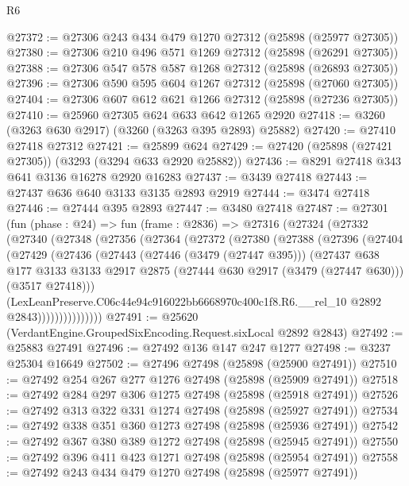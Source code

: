 \begin{lexlean}{R6}
\begin{coremodule}
@27372 := @27306 @243 @434 @479 @1270 @27312 (@25898 (@25977 @27305))
@27380 := @27306 @210 @496 @571 @1269 @27312 (@25898 (@26291 @27305))
@27388 := @27306 @547 @578 @587 @1268 @27312 (@25898 (@26893 @27305))
@27396 := @27306 @590 @595 @604 @1267 @27312 (@25898 (@27060 @27305))
@27404 := @27306 @607 @612 @621 @1266 @27312 (@25898 (@27236 @27305))
@27410 := @25960 @27305 @624 @633 @642 @1265 @2920
@27418 := @3260 (@3263 @630 @2917) (@3260 (@3263 @395 @2893) @25882)
@27420 := @27410 @27418 @27312
@27421 := @25899 @624
@27429 := @27420 (@25898 (@27421 @27305)) (@3293 (@3294 @633 @2920 @25882))
@27436 := @8291 @27418 @343 @641 @3136 @16278 @2920 @16283
@27437 := @3439 @27418
@27443 := @27437 @636 @640 @3133 @3135 @2893 @2919
@27444 := @3474 @27418
@27446 := @27444 @395 @2893
@27447 := @3480 @27418
@27487 := @27301
    (fun (phase : @24) =>
    fun (frame : @2836) =>
    @27316
      (@27324
        (@27332
          (@27340
            (@27348
              (@27356
                (@27364
                  (@27372
                    (@27380
                      (@27388
                        (@27396
                          (@27404
                            (@27429
                              (@27436
                                (@27443
                                  (@27446 (@3479 (@27447 @395)))
                                  (@27437
                                    @638
                                    @177
                                    @3133
                                    @3133
                                    @2917
                                    @2875
                                    (@27444 @630 @2917 (@3479 (@27447 @630)))
                                    (@3517 @27418)))
                                (LexLeanPreserve.C06c44e94c916022bb6668970c400c1f8.R6.__rel_10
                                  @2892
                                  @2843)))))))))))))))
@27491 := @25620 (VerdantEngine.GroupedSixEncoding.Request.sixLocal @2892 @2843)
@27492 := @25883 @27491
@27496 := @27492 @136 @147 @247 @1277
@27498 := @3237 @25304 @16649
@27502 := @27496 @27498 (@25898 (@25900 @27491))
@27510 := @27492 @254 @267 @277 @1276 @27498 (@25898 (@25909 @27491))
@27518 := @27492 @284 @297 @306 @1275 @27498 (@25898 (@25918 @27491))
@27526 := @27492 @313 @322 @331 @1274 @27498 (@25898 (@25927 @27491))
@27534 := @27492 @338 @351 @360 @1273 @27498 (@25898 (@25936 @27491))
@27542 := @27492 @367 @380 @389 @1272 @27498 (@25898 (@25945 @27491))
@27550 := @27492 @396 @411 @423 @1271 @27498 (@25898 (@25954 @27491))
@27558 := @27492 @243 @434 @479 @1270 @27498 (@25898 (@25977 @27491))

\end{coremodule}
\end{lexlean}
